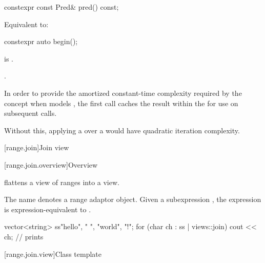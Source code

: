 %
\begin{itemdecl}
constexpr const Pred& pred() const;
\end{itemdecl}

\begin{itemdescr}
\pnum
\effects
Equivalent to: 
\end{itemdescr}

%
\begin{itemdecl}
constexpr auto begin();
\end{itemdecl}

\begin{itemdescr}
\pnum
\expects
{} is .

\pnum
\returns
{}.

\pnum
\remarks
In order to provide the amortized constant-time complexity
required by the  concept
when  models ,
the first call caches the result within the 
for use on subsequent calls.
\begin{note}
Without this,
applying a  over a 
would have quadratic iteration complexity.
\end{note}
\end{itemdescr}

[range.join]{Join view}

[range.join.overview]{Overview}

\pnum
{} flattens a view of ranges into a view.

\pnum
{}%
The name  denotes a
range adaptor object.
Given a subexpression , the expression
 is expression-equivalent to
.

\pnum
\begin{example}
\begin{codeblock}
vector<string> ss{"hello", " ", "world", "!"};
for (char ch : ss | views::join)
  cout << ch;                                   // prints 
\end{codeblock}
\end{example}

[range.join.view]{Class template }

